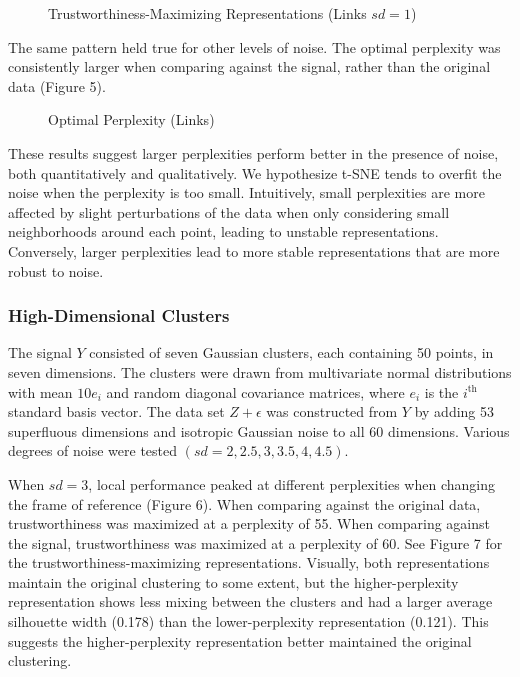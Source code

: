 \documentclass{article}
\begin{document}
\renewcommand{\thefigure}{4}
\begin{figure}[H]
\centering
\caption{Trustworthiness-Maximizing Representations (Links $sd = 1$)}
\end{figure}

The same pattern held true for other levels of noise. The optimal perplexity was consistently larger when comparing against the signal, rather than the original data (Figure 5).

\renewcommand{\thefigure}{5}
\begin{figure}[H]
\centering
\caption{Optimal Perplexity (Links)}
\end{figure}

These results suggest larger perplexities perform better in the presence of noise, both quantitatively and qualitatively. We hypothesize t-SNE tends to overfit the noise when the perplexity is too small. Intuitively, small perplexities are more affected by slight perturbations of the data when only considering small neighborhoods around each point, leading to unstable representations. Conversely, larger perplexities lead to more stable representations that are more robust to noise.

\subsubsection{High-Dimensional Clusters}
The signal $Y$ consisted of seven Gaussian clusters, each containing 50 points, in seven dimensions. The clusters were drawn from multivariate normal distributions with mean $10e_i$ and random diagonal covariance matrices, where $e_i$ is the $i^\textrm{th}$ standard basis vector. The data set $Z + \epsilon$ was constructed from $Y$ by adding 53 superfluous dimensions and isotropic Gaussian noise to all 60 dimensions. Various degrees of noise were tested $(sd = 2, 2.5, 3, 3.5, 4, 4.5)$.

When $sd = 3$, local performance peaked at different perplexities when changing the frame of reference (Figure 6). When comparing against the original data, trustworthiness was maximized at a perplexity of 55. When comparing against the signal, trustworthiness was maximized at a perplexity of 60. See Figure 7 for the trustworthiness-maximizing representations. Visually, both representations maintain the original clustering to some extent, but the higher-perplexity representation shows less mixing between the clusters and had a larger average silhouette width (0.178) than the lower-perplexity representation (0.121). This suggests the higher-perplexity representation better maintained the original clustering.
\end{document}
